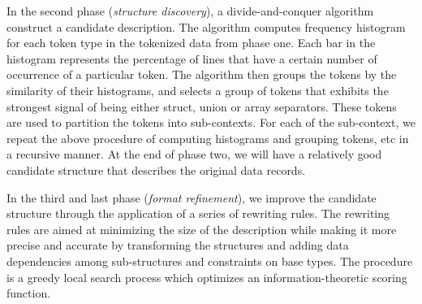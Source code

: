 In the second phase ({\em structure discovery}), 
a divide-and-conquer algorithm  construct a candidate description.
The algorithm computes frequency histogram for each token type in the
tokenized data from phase one. Each bar in the histogram represents
the percentage of lines that have a certain number of occurrence of
a particular token. 
%
The algorithm then groups the tokens by the similarity of their histograms,
and selects a group of tokens that exhibits the strongest signal of being
either struct, union or array separators. These tokens are used 
to partition the tokens into sub-contexts. For each of the sub-context,
we repeat the above procedure of computing histograms and grouping
tokens, etc in a recursive manner. At the end of phase two, we will have
a relatively good candidate structure that describes the original data records.

In the third and last phase ({\em format refinement}),
we improve the candidate structure through the application of a series of
rewriting rules. The rewriting rules are aimed at minimizing the size
of the description while
making it more precise and accurate by transforming the structures and 
adding data dependencies among sub-structures and constraints on base types.
The procedure is a greedy local search process which optimizes an information-theoretic
scoring function. 

